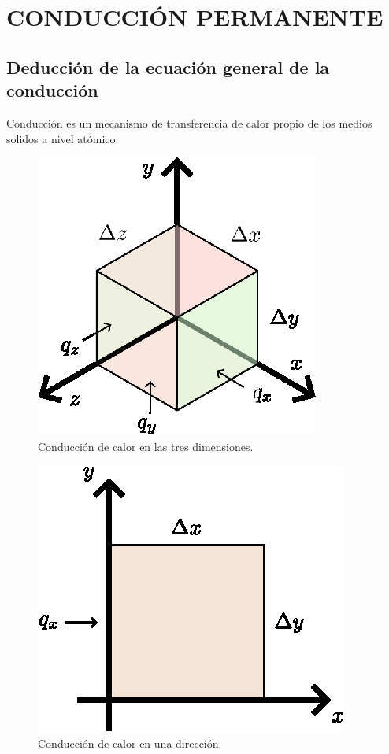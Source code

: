 \chapter{CONDUCCIÓN PERMANENTE}

\section{Deducción de la ecuación general de la conducción}
Conducción es un mecanismo de transferencia de calor propio de los medios
solidos a nivel atómico.

\begin{figure}[!h]
\centering
\includegraphics[scale=1.00]{figura02_01.eps}
\caption{Conducción de calor en las tres dimensiones.}
\end{figure}

\begin{figure}[!h]
\centering
\includegraphics[scale=0.80]{figura02_02.eps}
\caption{Conducción de calor en una dirección.}
\end{figure}

